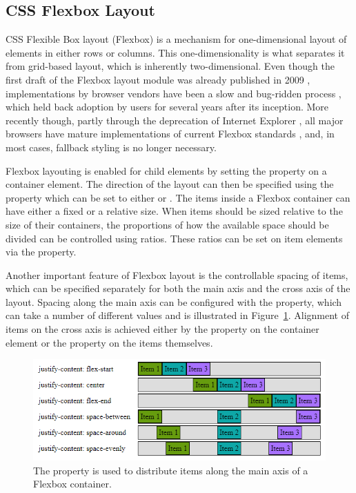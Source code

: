 \subsection{CSS Flexbox Layout}
\label{sec:Flexbox}

CSS Flexible Box layout (Flexbox) \parencite{CSSFlexbox} is a
mechanism for one-dimensional layout of elements in either rows or
columns. This one-dimensionality is what separates it from grid-based
layout, which is inherently two-dimensional.
%
Even though the first draft of the Flexbox layout module was already
published in 2009 \parencite{CSSFlexboxFirstDraft}, implementations by
browser vendors have been a slow and bug-ridden process
\parencite{CanIUseCSSFlexbox}, which held back adoption by users for
several years after its inception. More recently though, partly
through the deprecation of Internet Explorer
\parencite{IEDeprecation}, all major browsers have mature
implementations of current Flexbox standards \parencite{CSSFlexbox},
and, in most cases, fallback styling is no longer necessary.

Flexbox layouting is enabled for child elements by setting the
 property on a container element. The direction
of the layout can then be specified using the 
property which can be set to either  or .
%
The items inside a Flexbox container can have either a fixed or a
relative size. When items should be sized relative to the size of
their containers, the proportions of how the available space should be
divided can be controlled using ratios. These ratios can be set on
item elements via the  property.

Another important feature of Flexbox layout is the controllable
spacing of items, which can be specified separately for both the main
axis and the cross axis of the layout. Spacing along the main axis can
be configured with the  property, which can
take a number of different values and is illustrated in
Figure~\ref{fig:FlexboxJustifyContent}. Alignment of items on the
cross axis is achieved either by the  property on
the container element or the  property on the
items themselves.

\begin{figure}[tp]
\centering
\includegraphics[keepaspectratio,width=\linewidth,height=\thirdh]
{images/flexbox-justify-content.png}
\caption[Flexbox  Property]{
The  property is used to distribute
items along the main axis of a Flexbox container. 
}
\label{fig:FlexboxJustifyContent}
\end{figure}


